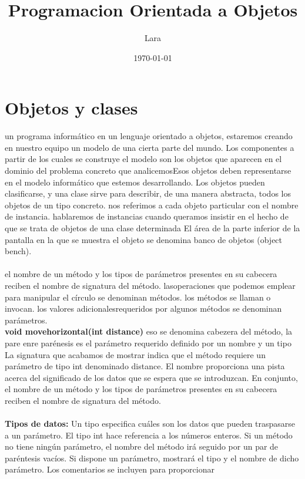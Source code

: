 \documentclass[11pt,a4paper]{article}
\title{Programacion Orientada a Objetos}
\author{Lara}
\date{\today}
\begin{document}
	\maketitle
	\section{Objetos y clases}
	un programa informático en un lenguaje orientado a objetos, estaremos creando en
	nuestro equipo un modelo de una cierta parte del mundo. Los componentes a partir de los cuales
	se construye el modelo son los objetos que aparecen en el dominio del problema concreto que
	analicemosEsos objetos deben representarse en el modelo informático que estemos desarrollando. Los objetos pueden clasificarse, y una clase sirve para describir, de una manera abstracta, todos los
	objetos de un tipo concreto. nos referimos a cada objeto particular con el nombre de instancia. hablaremos de instancias cuando queramos insistir en el hecho
	de que se trata de objetos de una clase determinada
	El área de la parte
	inferior de la pantalla en la que se muestra el objeto se denomina banco de objetos (object bench).\\
	\\
	el nombre de un método y los tipos de parámetros presentes en su cabecera
	reciben el nombre de signatura del método. lasoperaciones que podemos emplear para manipular el círculo se denominan métodos. los métodos se llaman o invocan. los valores adicionalesrequeridos por algunos métodos se denominan parámetros.\\ \textbf{void movehorizontal(int distance)} eso se denomina cabezera del método, la pare enre parénesis es el parámetro requerido definido por un nombre y un tipo \\
	La signatura que acabamos
	de mostrar indica que el método requiere un parámetro de tipo int denominado distance.
	El nombre proporciona una pista acerca del significado de los datos que se espera que se introduzcan.
	En conjunto, el nombre de un método y los tipos de parámetros presentes en su cabecera
	reciben el nombre de signatura del método.
	\\
	\\
	\textbf{Tipos de datos: }Un tipo especifica cuáles son los datos que pueden traspasarse a un parámetro. El tipo int hace
	referencia a los números enteros. Si un método no tiene ningún
	parámetro, el nombre del método irá seguido por un par de paréntesis vacíos. Si dispone un parámetro, mostrará el tipo y el nombre de dicho parámetro.
	Los comentarios se incluyen para proporcionar
\end{document}
